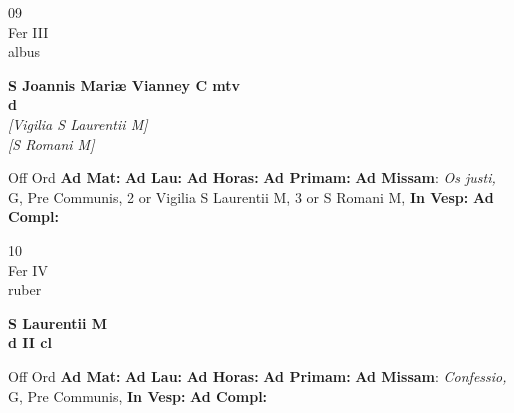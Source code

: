 \documentclass[10pt, openany]{book}
\begin{document}
    \begin{center}
        \begin{minipage}{3.5in}
            \vspace{2em}
            \begin{minipage}{0.5in}
                {\Huge 09} \\
                {\normalsize Fer III} \\
                {\normalsize albus}
            \end{minipage}
            \begin{minipage}{3.0in}
                \textbf{ \large S Joannis Mariæ Vianney C mtv \\
                \textnormal{\normalsize d}} \\ \textit{[Vigilia S Laurentii M]} \\ \textit{[S Romani M]} \\ 
            \end{minipage}
            \begin{justify}Off Ord
                \textbf{Ad Mat: }
                \textbf{Ad Lau: }
                \textbf{Ad Horas: }
                \textbf{Ad Primam: }\textbf{Ad Missam}: \textit{Os justi,} G, Pre Communis, 2 or Vigilia S Laurentii M, 3 or S Romani M,  
                \textbf{In Vesp: }
                \textbf{Ad Compl: }
            \end{justify}
        \end{minipage}
    \end{center}

    \begin{center}
        \begin{minipage}{3.5in}
            \vspace{2em}
            \begin{minipage}{0.5in}
                {\Huge 10} \\
                {\normalsize Fer IV} \\
                {\normalsize ruber}
            \end{minipage}
            \begin{minipage}{3.0in}
                \textbf{ \large S Laurentii M \\
                \textnormal{\normalsize d II cl}} \\ 
            \end{minipage}
            \begin{justify}Off Ord
                \textbf{Ad Mat: }
                \textbf{Ad Lau: }
                \textbf{Ad Horas: }
                \textbf{Ad Primam: }\textbf{Ad Missam}: \textit{Confessio,} G, Pre Communis,  
                \textbf{In Vesp: }
                \textbf{Ad Compl: }
            \end{justify}
        \end{minipage}
    \end{center}
\end{document}
